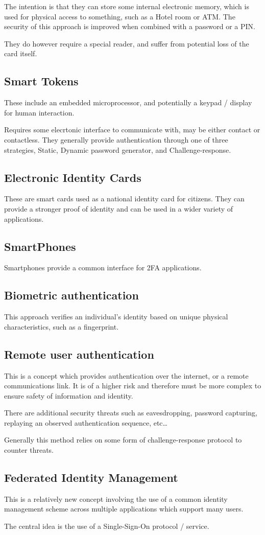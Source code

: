 The intention is that they can store some internal electronic memory, which is used for physical access to something,
such as a Hotel room or ATM. The security of this approach is improved when combined with a password or a PIN.

They do however require a special reader, and suffer from potential loss of the card itself.

\subsection{Smart Tokens}
These include an embedded microprocessor, and potentially a keypad / display for human interaction.

Requires some elecrtonic interface to communicate with, may be either contact or contactless. They generally
provide authentication through one of three strategies, Static, Dynamic password generator, and Challenge-response.

\subsection{Electronic Identity Cards}
These are smart cards used as a national identity card for citizens. They can provide a stronger proof of identity and
can be used in a wider variety of applications.

\subsection{SmartPhones}
Smartphones provide a common interface for 2FA applications.

\subsection{Biometric authentication}
This approach verifies an individual's identity based on unique physical characteristics, such as a fingerprint.

\subsection{Remote user authentication}
This is a concept which provides authentication over the internet, or a remote communications link. It is of a higher risk
and therefore must be more complex to ensure safety of information and identity.

There are additional security threats such as eavesdropping, password capturing, replaying an observed authentication sequence, etc\ldots

Generally this method relies on some form of challenge-response protocol to counter threats.

\subsection{Federated Identity Management}
This is a relatively new concept involving the use of a common identity management scheme across
multiple applications which support many users.

The central idea is the use of a Single-Sign-On protocol / service.